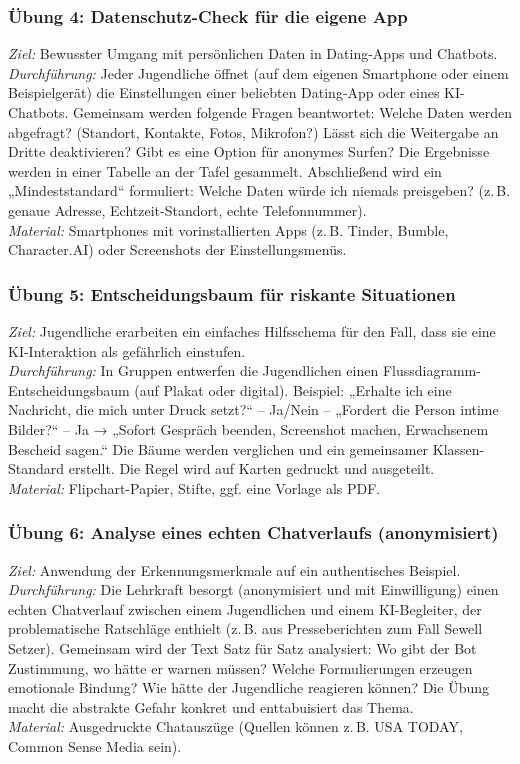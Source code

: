 \documentclass[12pt,a4paper,oneside]{scrartcl}
\begin{document}
	\subsubsection{Übung 4: Datenschutz-Check für die eigene App}
	\textit{Ziel:} Bewusster Umgang mit persönlichen Daten in Dating-Apps und Chatbots. \\
	\textit{Durchführung:} Jeder Jugendliche öffnet (auf dem eigenen Smartphone oder einem Beispielgerät) die Einstellungen einer beliebten Dating-App oder eines KI-Chatbots. Gemeinsam werden folgende Fragen beantwortet: Welche Daten werden abgefragt? (Standort, Kontakte, Fotos, Mikrofon?) Lässt sich die Weitergabe an Dritte deaktivieren? Gibt es eine Option für anonymes Surfen? Die Ergebnisse werden in einer Tabelle an der Tafel gesammelt. Abschließend wird ein „Mindeststandard“ formuliert: Welche Daten würde ich niemals preisgeben? (z.\,B. genaue Adresse, Echtzeit-Standort, echte Telefonnummer). \\
	\textit{Material:} Smartphones mit vorinstallierten Apps (z.\,B. Tinder, Bumble, Character.AI) oder Screenshots der Einstellungsmenüs.
	
	\subsubsection{Übung 5: Entscheidungsbaum für riskante Situationen}
	\textit{Ziel:} Jugendliche erarbeiten ein einfaches Hilfsschema für den Fall, dass sie eine KI-Interaktion als gefährlich einstufen. \\
	\textit{Durchführung:} In Gruppen entwerfen die Jugendlichen einen Flussdiagramm-Entscheidungsbaum (auf Plakat oder digital). Beispiel: „Erhalte ich eine Nachricht, die mich unter Druck setzt?“ – Ja/Nein – „Fordert die Person intime Bilder?“ – Ja → „Sofort Gespräch beenden, Screenshot machen, Erwachsenem Bescheid sagen.“ Die Bäume werden verglichen und ein gemeinsamer Klassen-Standard erstellt. Die Regel wird auf Karten gedruckt und ausgeteilt. \\
	\textit{Material:} Flipchart-Papier, Stifte, ggf. eine Vorlage als PDF.
	
	\subsubsection{Übung 6: Analyse eines echten Chatverlaufs (anonymisiert)}
	\textit{Ziel:} Anwendung der Erkennungsmerkmale auf ein authentisches Beispiel. \\
	\textit{Durchführung:} Die Lehrkraft besorgt (anonymisiert und mit Einwilligung) einen echten Chatverlauf zwischen einem Jugendlichen und einem KI-Begleiter, der problematische Ratschläge enthielt (z.\,B. aus Presseberichten zum Fall Sewell Setzer). Gemeinsam wird der Text Satz für Satz analysiert: Wo gibt der Bot Zustimmung, wo hätte er warnen müssen? Welche Formulierungen erzeugen emotionale Bindung? Wie hätte der Jugendliche reagieren können? Die Übung macht die abstrakte Gefahr konkret und enttabuisiert das Thema. \\
	\textit{Material:} Ausgedruckte Chatauszüge (Quellen können z.\,B. USA TODAY, Common Sense Media sein).
	
\end{document}
